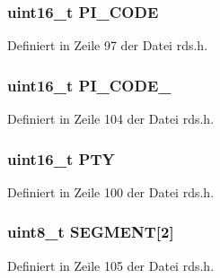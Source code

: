 \subsubsection[{P\+I\+\_\+\+C\+O\+D\+E}]{\setlength{\rightskip}{0pt plus 5cm}uint16\+\_\+t P\+I\+\_\+\+C\+O\+D\+E}\label{structgroup__2b_a5cd9b1f6413028425796c1129aa8fd87}


Definiert in Zeile 97 der Datei rds.\+h.

\hypertarget{structgroup__2b_ae86fed9d07832a5c3cc36d5aaa064bcb}{}
\subsubsection[{P\+I\+\_\+\+C\+O\+D\+E\+\_\+2}]{\setlength{\rightskip}{0pt plus 5cm}uint16\+\_\+t P\+I\+\_\+\+C\+O\+D\+E\+\_}\label{structgroup__2b_ae86fed9d07832a5c3cc36d5aaa064bcb}


Definiert in Zeile 104 der Datei rds.\+h.

\hypertarget{structgroup__2b_a0474967478fbbc2c71b800d2e0132d45}{}
\subsubsection[{P\+T\+Y}]{\setlength{\rightskip}{0pt plus 5cm}uint16\+\_\+t P\+T\+Y}\label{structgroup__2b_a0474967478fbbc2c71b800d2e0132d45}


Definiert in Zeile 100 der Datei rds.\+h.

\hypertarget{structgroup__2b_ad4b043906241d98e6b480a31f1438352}{}
\subsubsection[{S\+E\+G\+M\+E\+N\+T}]{\setlength{\rightskip}{0pt plus 5cm}uint8\+\_\+t S\+E\+G\+M\+E\+N\+T\mbox{[}2\mbox{]}}\label{structgroup__2b_ad4b043906241d98e6b480a31f1438352}


Definiert in Zeile 105 der Datei rds.\+h.

\hypertarget{structgroup__2b_ab9e634c63b0d95a96716d5f6d7f06d72}{}
